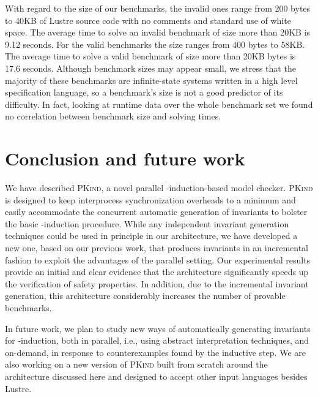 \documentclass[submission,copyright,creativecommons]{eptcs}
\newcommand{\PKind}{\textrm{\textsc{PKind}}\xspace}
\begin{document}
With regard to the size of our benchmarks, 
the invalid ones range from 200 bytes to 40KB 
of Lustre source code with no comments and standard use of white space.  
The average time to solve an invalid
benchmark of size more than 20KB is 9.12 seconds.  For the valid
benchmarks the size ranges from 400 bytes to 58KB. The average time
to solve a valid benchmark of size more than 20KB bytes is 17.6
seconds. 
Although benchmark sizes may appear small,
we stress that
the majority of these benchmarks are infinite-state systems written in
a high level specification language, so a benchmark's size is not a
good predictor of its difficulty. In fact, looking at runtime data
over the whole benchmark set we found no correlation between benchmark
size and solving times.


\vspace{-0.5cm}

\section{Conclusion and future work}

We have described \PKind, a novel parallel
-induction-based model checker. \PKind is designed to keep
interprocess synchronization overheads to a minimum and easily
accommodate the concurrent automatic generation of invariants 
to bolster the basic -induction procedure.  
While any independent invariant generation techniques 
could be used in principle in our architecture, we have
developed a new one, based on our previous work, that produces
invariants in an incremental fashion to exploit the advantages of the
parallel setting.  
Our experimental results provide an initial and
clear evidence that
the architecture significantly speeds up the verification of safety
properties. In addition, due to the incremental invariant generation, this architecture
considerably increases the number of provable benchmarks.

In future work, we plan to study new ways of automatically generating
invariants for -induction,
both in parallel, i.e., using abstract interpretation techniques,
and on-demand, in response to counterexamples found by the inductive step.
We are also working on a new version of \PKind built from scratch
around the architecture discussed here and 
designed to accept other input languages besides Lustre.


\nocite{*}


\end{document}
